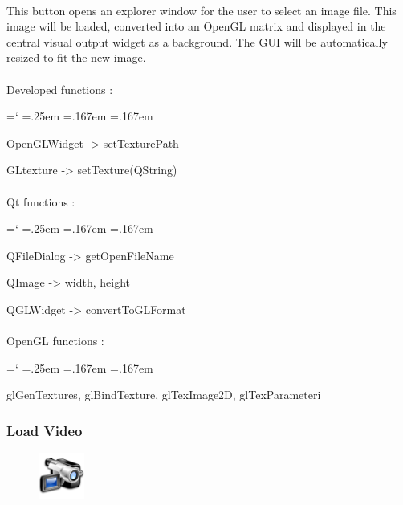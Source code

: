 \documentclass[12pt]{report}
\DeclareRobustCommand*{\ttfamily}{
  \origttfamily
  \hyphenchar\font=`\-\relax
  \fontdimen3\font=.25em\relax
  \fontdimen4\font=.167em\relax
  \fontdimen7\font=.167em\relax
}
\newenvironment{code}{\ttfamily}{}
\begin{document}
\paragraph{}
	This button opens an explorer window for the user to select an image file. This image will be loaded, converted into an OpenGL matrix and displayed in the central visual output widget as a background. The GUI will be automatically resized to fit the new image.

\paragraph{}
	Developed functions :

	\begin{code}
	OpenGLWidget -> setTexturePath
	
	GLtexture -> setTexture(QString)
	\end{code}

\paragraph{}
	Qt functions :

	\begin{code}
	QFileDialog -> getOpenFileName

	QImage -> width, height

	QGLWidget -> convertToGLFormat
	\end{code}

\paragraph{}
	OpenGL functions :

	\begin{code}
	glGenTextures, glBindTexture, glTexImage2D, glTexParameteri
	\end{code}



\subsubsection{Load Video} \label{subsubsec:load video}

\begin{figure}
\vspace{-20pt}
\includegraphics[width=1.5cm]{icons/camera.png}
\end{figure}
\end{document}

